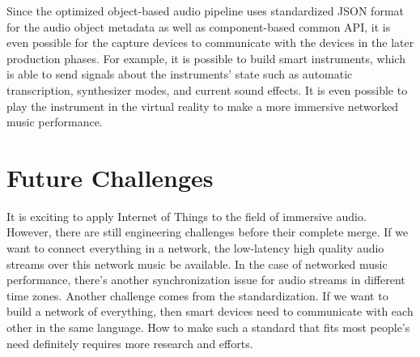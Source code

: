 \documentclass[jou]{apa6}
\begin{document}
Since the optimized object-based audio pipeline uses standardized JSON format for the audio object metadata as well as component-based common API, it is even possible for the capture devices to communicate with the devices in the later production phases. For example, it is possible to build smart instruments, which is able to send signals about the instruments' state such as automatic transcription, synthesizer modes, and current sound effects. It is even possible to play the instrument in the virtual reality to make a more immersive networked music performance.

\section{Future Challenges}

It is exciting to apply Internet of Things to the field of immersive audio. However, there are still engineering challenges before their complete merge. If we want to connect everything in a network, the low-latency high quality audio streams over this network music be available. In the case of networked music performance, there's another synchronization issue for audio streams in different time zones. Another challenge comes from the standardization. If we want to build a network of everything, then smart devices need to communicate with each other in the same language. How to make such a standard that fits most people's need definitely requires more research and efforts.

\printbibliography
\end{document}
